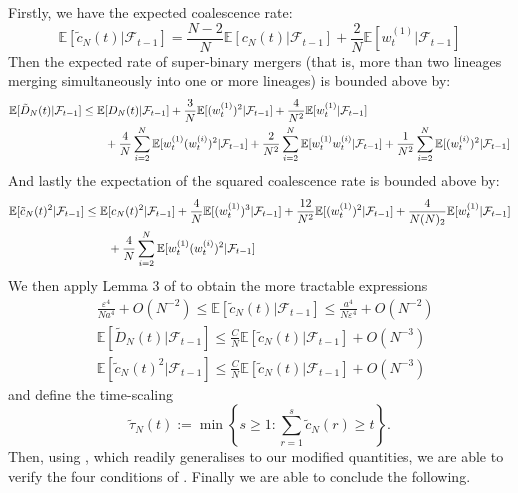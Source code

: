 \documentclass[fleqn]{article}
\theoremstyle{definition}
\newcommand{\E}{\mathbb{E}}
\newcommand{\F}{\mathcal{F}_{t-1}}
\newcommand{\wt}[2][t]{w_{#1}^{(#2)}}
\begin{document}
Firstly, we have the expected coalescence rate:
\begin{equation}\label{eq:cNtilde}
\E[\tilde{c}_N(t) |\F] = \frac{N-2}{N} \E[c_N(t) |\F] + \frac{2}{N} \E[\wt{1} |\F]
\end{equation}
Then the expected rate of super-binary mergers (that is, more than two lineages merging simultaneously into one or more lineages) is bounded above by:
\begin{align}\label{eq:DNtilde}
\E[\tilde{D}_N(t) |\F] 
&\leq \E[D_N(t) |\F] + \frac{3}{N} \E[(\wt{1})^2 |\F] +  \frac{4}{N^2}\E[\wt{1} |\F] \notag\\
&\qquad+ \frac{4}{N}\sum_{i=2}^N \E[\wt{1}(\wt{i})^2 |\F] +\frac{2}{N^2}\sum_{i=2}^N \E[\wt{1}\wt{i} |\F] + \frac{1}{N^2} \sum_{i=2}^N \E[(\wt{i})^2 |\F] 
\end{align}
And lastly the expectation of the squared coalescence rate is bounded above by:
\begin{align}\label{eq:cNtilde2}
\E[\tilde{c}_N(t)^2 |\F] 
&\leq \E[c_N(t)^2 |\F] + \frac{4}{N}\E[(\wt{1})^3 |\F] + \frac{12}{N^2} \E[(\wt{1})^2 |\F] + \frac{4}{N(N)_2} \E[\wt{1} |\F] \notag\\
&\qquad + \frac{4}{N} \sum_{i=2}^N \E[\wt{1}(\wt{i})^2 |\F]
\end{align}
We then apply Lemma 3 of \citet{koskela2018} to obtain the more tractable expressions
\begin{align*}
& \frac{\varepsilon^4}{Na^4} + O(N^{-2}) \leq \E[\tilde{c}_N(t) |\F]  \leq \frac{a^4}{N\varepsilon^4} + O(N^{-2}) \\
& \E[\tilde{D}_N(t) |\F] \leq \frac{C}{N} \E[\tilde{c}_N(t) |\F] + O(N^{-3}) \\
& \E[\tilde{c}_N(t)^2 |\F] \leq \frac{C}{N} \E[\tilde{c}_N(t) |\F] + O(N^{-3})
\end{align*}
and define the time-scaling
\begin{equation}\label{eq:tau_tilde}
\tilde{\tau}_N(t) := \min\left\{ s\geq 1 : \sum_{r=1}^s \tilde{c}_N(r) \geq t \right\}.
\end{equation}
Then, using \citet[Lemma 2]{koskela2018}, which readily generalises to our modified quantities, we are able to verify the four conditions of \citet[Theorem 1]{koskela2018}. Finally we are able to conclude the following.
\end{document}
